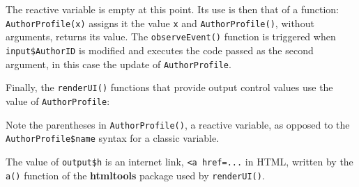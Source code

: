\documentclass[
  12pt,
  american,
  a4paper,
  extrafontsizes,onecolumn,openright
  ]{memoir}
\newenvironment{Shaded}{\begin{snugshade}}{\end{snugshade}}
\newcommand{\AttributeTok}[1]{\textcolor[rgb]{0.13,0.29,0.53}{#1}}
\newcommand{\CommentTok}[1]{\textcolor[rgb]{0.56,0.35,0.01}{\textit{#1}}}
\newcommand{\FunctionTok}[1]{\textcolor[rgb]{0.13,0.29,0.53}{\textbf{#1}}}
\newcommand{\NormalTok}[1]{#1}
\newcommand{\OtherTok}[1]{\textcolor[rgb]{0.56,0.35,0.01}{#1}}
\newcommand{\SpecialCharTok}[1]{\textcolor[rgb]{0.81,0.36,0.00}{\textbf{#1}}}
\newcommand{\StringTok}[1]{\textcolor[rgb]{0.31,0.60,0.02}{#1}}
\begin{document}
\normalsize

The reactive variable is empty at this point.
Its use is then that of a function: \texttt{AuthorProfile(x)} assigns it the value \texttt{x} and \texttt{AuthorProfile()}, without arguments, returns its value.
The \texttt{observeEvent()} function is triggered when \texttt{input\$AuthorID} is modified and executes the code passed as the second argument, in this case the update of \texttt{AuthorProfile}.

\scriptsize

\begin{Shaded}
\end{Shaded}

\normalsize

Finally, the \texttt{renderUI()} functions that provide output control values use the value of \texttt{AuthorProfile}:

\scriptsize

\begin{Shaded}
\end{Shaded}

\normalsize

Note the parentheses in \texttt{AuthorProfile()}, a reactive variable, as opposed to the \texttt{AuthorProfile\$name} syntax for a classic variable.

The value of \texttt{output\$h} is an internet link, \texttt{\textless{}a\ href=...} in HTML, written by the \texttt{a()} function of the \textbf{htmltools} package used by \texttt{renderUI()}.

\scriptsize

\begin{Shaded}
\end{Shaded}
\end{document}
